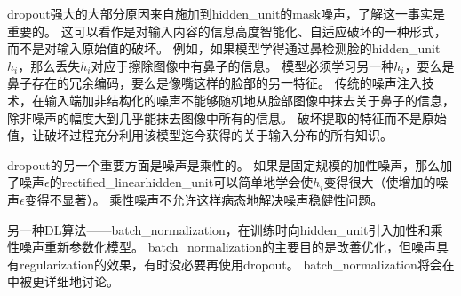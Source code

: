 \gls{dropout}强大的大部分原因来自施加到\gls{hidden_unit}的\gls{mask}噪声，了解这一事实是重要的。
这可以看作是对输入内容的信息高度智能化、自适应破坏的一种形式，而不是对输入原始值的破坏。
例如，如果模型学得通过鼻检测脸的\gls{hidden_unit} $h_i$，那么丢失$h_i$对应于擦除图像中有鼻子的信息。
模型必须学习另一种$h_i$，要么是鼻子存在的冗余编码，要么是像嘴这样的脸部的另一特征。
传统的噪声注入技术，在输入端加非结构化的噪声不能够随机地从脸部图像中抹去关于鼻子的信息，除非噪声的幅度大到几乎能抹去图像中所有的信息。
破坏提取的特征而不是原始值，让破坏过程充分利用该模型迄今获得的关于输入分布的所有知识。

\gls{dropout}的另一个重要方面是噪声是乘性的。
如果是固定规模的加性噪声，那么加了噪声$\epsilon$的\gls{rectified_linear}\gls{hidden_unit}可以简单地学会使$h_i$变得很大（使增加的噪声$\epsilon$变得不显著）。
乘性噪声不允许这样病态地解决噪声稳健性问题。


另一种\gls{DL}算法——\gls{batch_normalization}，在训练时向\gls{hidden_unit}引入加性和乘性噪声重新参数化模型。
\gls{batch_normalization}的主要目的是改善优化，但噪声具有\gls{regularization}的效果，有时没必要再使用\gls{dropout}。
\gls{batch_normalization}将会在中被更详细地讨论。



